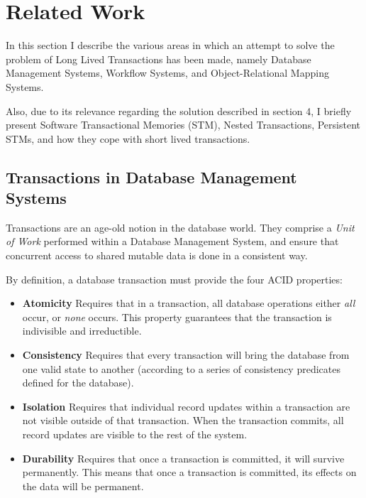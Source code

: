\chapter{Related Work}
\label{chap:related}

In this section I describe the various areas in which an attempt to
solve the problem of Long Lived Transactions has been made, namely
Database Management Systems, Workflow Systems, and Object-Relational
Mapping Systems.

Also, due to its relevance regarding the solution described in section
4, I briefly present Software Transactional Memories (STM), Nested
Transactions, Persistent STMs, and how they cope with short lived
transactions.

\section{Transactions in Database Management Systems}
\label{sec:rdbms}

Transactions are an age-old notion in the database world. They
comprise a {\it Unit of Work} performed within a Database Management
System, and ensure that concurrent access to shared mutable data is
done in a consistent way.

By definition, a database transaction must provide the four ACID
properties:

\begin{itemize}

\item {\bf Atomicity} Requires that in a transaction, all database
  operations either {\it all} occur, or {\it none} occurs. This
  property guarantees that the transaction is indivisible and
  irreductible.

\item {\bf Consistency} Requires that every transaction will bring the
  database from one valid state to another (according to a series of
  consistency predicates defined for the database).

\item {\bf Isolation} Requires that individual record updates within a
  transaction are not visible outside of that transaction. When the
  transaction commits, all record updates are visible to the rest of
  the system.

\item {\bf Durability} Requires that once a transaction is committed,
  it will survive permanently. This means that once a transaction is
  committed, its effects on the data will be permanent.

\end{itemize}

